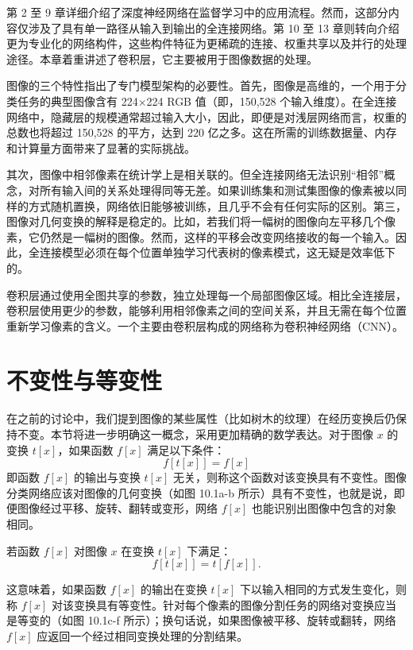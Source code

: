 \documentclass[lang=cn,newtx,10pt,scheme=chinese]{elegantbook}
\begin{document}
第 2 至 9 章详细介绍了深度神经网络在监督学习中的应用流程。然而，这部分内容仅涉及了具有单一路径从输入到输出的全连接网络。第 10 至 13 章则转向介绍更为专业化的网络构件，这些构件特征为更稀疏的连接、权重共享以及并行的处理途径。本章着重讲述了卷积层，它主要被用于图像数据的处理。

图像的三个特性指出了专门模型架构的必要性。首先，图像是高维的，一个用于分类任务的典型图像含有 224×224 RGB 值（即，150,528 个输入维度）。在全连接网络中，隐藏层的规模通常超过输入大小，因此，即便是对浅层网络而言，权重的总数也将超过 150,528 的平方，达到 220 亿之多。这在所需的训练数据量、内存和计算量方面带来了显著的实际挑战。

其次，图像中相邻像素在统计学上是相关联的。但全连接网络无法识别“相邻”概念，对所有输入间的关系处理得同等无差。如果训练集和测试集图像的像素被以同样的方式随机置换，网络依旧能够被训练，且几乎不会有任何实际的区别。第三，图像对几何变换的解释是稳定的。比如，若我们将一幅树的图像向左平移几个像素，它仍然是一幅树的图像。然而，这样的平移会改变网络接收的每一个输入。因此，全连接模型必须在每个位置单独学习代表树的像素模式，这无疑是效率低下的。

卷积层通过使用全图共享的参数，独立处理每一个局部图像区域。相比全连接层，卷积层使用更少的参数，能够利用相邻像素之间的空间关系，并且无需在每个位置重新学习像素的含义。一个主要由卷积层构成的网络称为卷积神经网络（CNN）。

\section{不变性与等变性}
在之前的讨论中，我们提到图像的某些属性（比如树木的纹理）在经历变换后仍保持不变。本节将进一步明确这一概念，采用更加精确的数学表达。对于图像 \(x\) 的变换 \(t[x]\)，如果函数 \(f[x]\) 满足以下条件：
\begin{equation}
f[t[x]] = f[x] 
\end{equation}
即函数 \(f[x]\) 的输出与变换 \(t[x]\) 无关，则称这个函数对该变换具有不变性。图像分类网络应该对图像的几何变换（如图 10.1a-b 所示）具有不变性，也就是说，即便图像经过平移、旋转、翻转或变形，网络 \(f[x]\) 也能识别出图像中包含的对象相同。

若函数 \(f[x]\) 对图像 \(x\) 在变换 \(t[x]\) 下满足：
\begin{equation}
f[t[x]] = t[f[x]]. 
\end{equation}

这意味着，如果函数 \(f[x]\) 的输出在变换 \(t[x]\) 下以输入相同的方式发生变化，则称 \(f[x]\) 对该变换具有等变性。针对每个像素的图像分割任务的网络对变换应当是等变的（如图 10.1c-f 所示）；换句话说，如果图像被平移、旋转或翻转，网络 \(f[x]\) 应返回一个经过相同变换处理的分割结果。
\end{document}
